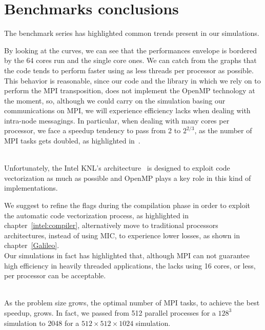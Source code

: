 \section{Benchmarks conclusions}
The benchmark series has highlighted common trends present in our simulations.
\par
By looking at the curves, we can see that the performances envelope is bordered by the 64 cores run and the single core ones.  We can catch from the graphs that the code tends to perform faster using as less threads per processor as possible.  This behavior is reasonable, since our code and the library in which we rely on to perform the MPI transposition, does not implement the OpenMP technology at the moment, so, although we could carry on the simulation basing our communications on MPI, we will experience efficiency lacks when dealing with intra-node messagings. In particular, when dealing with many cores per processor, we face a speedup tendency to pass from 2 to $2^{2/3}$, as the number of MPI tasks gets doubled, as highlighted in~\cite{dns:gpu:supercomputer}. \\~\par
Unfortunately, the Intel KNL's architecture~\cite{intel:xeonphi} is designed to exploit code vectorization as much as possible and OpenMP plays a key role in this kind of implementations. \par
We suggest to refine the flags during the compilation phase in order to exploit the automatic code vectorization process, as highlighted in chapter~\ref{intel:compiler}, alternatively move to traditional processors architectures, instead of using MIC, to experience lower losses, as shown in chapter~\ref{Galileo}. \\
Our simulations in fact has highlighted that, although MPI can not guarantee high efficiency in heavily threaded applications, the lacks using 16 cores, or less, per processor can be acceptable.\\~\par

As the problem size grows, the optimal number of MPI tasks, to achieve the best speedup, grows. In fact, we passed from 512 parallel processes for a $128^{3}$ simulation to 2048 for a $512\times 512 \times1024$ simulation. \par

